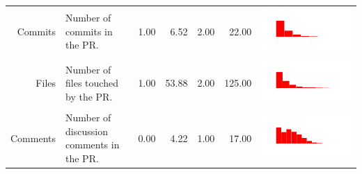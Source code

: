 \documentclass[conference]{IEEEtran}
\begin{document}
\begin{table}[ht]
\begin{tabular}{rp{26em}rrrrc}
    Commits & Number of commits in the PR. & 1.00 & 6.52 & 2.00 & 22.00 & \includegraphics[scale = 0.1, clip = true, trim= 50px 60px 50px 60px]{../figs/hist-features/hist-commits.pdf} \\
    Files & Number of files touched by the PR. & 1.00 & 53.88 & 2.00 & 125.00 & \includegraphics[scale = 0.1, clip = true, trim= 50px 60px 50px 60px]{../figs/hist-features/hist-files.pdf} \\
    Comments & Number of discussion comments in the PR. & 0.00 & 4.22 & 1.00 & 17.00 & \includegraphics[scale = 0.1, clip = true, trim= 50px 60px 50px 60px]{../figs/hist-features/hist-comments.pdf} \\

\end{tabular}
\end{table}
\end{document}
